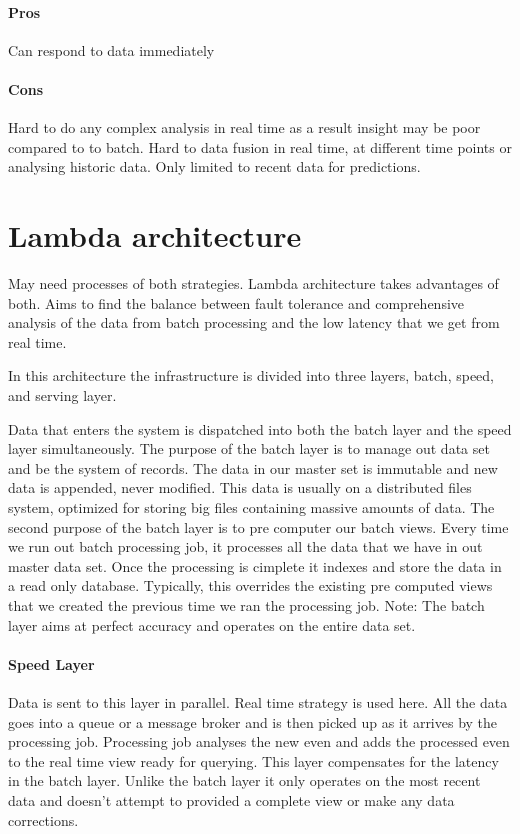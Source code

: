 \documentclass[a4paper, 11pt]{book}
\begin{document}
{    \paragraph{Pros}
    Can respond to data immediately

    \paragraph{Cons}
    Hard to do any complex analysis in real time as a result insight may be poor compared to to batch.
    Hard to data fusion in real time, at different time points or analysing historic data. Only limited to recent data for predictions.


    \section{Lambda architecture}
    May need processes of both strategies.
    Lambda architecture takes advantages of both.
    Aims to find the balance between fault tolerance and comprehensive analysis of the data from batch processing and the low latency that we get from real time.

    In this architecture the infrastructure is divided into three layers, batch, speed, and serving layer.

    Data that enters the system is dispatched into both the batch layer and the speed layer simultaneously.
    The purpose of the batch layer is to manage out data set and be the system of records.
    The data in our master set is immutable and new data is appended, never modified.
    This data is usually on a distributed files system, optimized for storing big files containing massive amounts of data.
    The second purpose of the batch layer is to pre computer our batch views.
    Every time we run out batch processing job, it processes all the data that we have in out master data set.
    Once the processing is cimplete it indexes and store the data in a read only database.
    Typically, this overrides the existing pre computed views that we created the previous time we ran the processing job.
    Note: The batch layer aims at perfect accuracy and operates on the entire data set.

    \paragraph{Speed Layer}
    Data is sent to this layer in parallel.
    Real time strategy is used here.
    All the data goes into a queue or a message broker and is then picked up as it arrives by the processing job.
    Processing job analyses the new even and adds the processed even to the real time view ready for querying.
    This layer compensates for the latency in the batch layer.
    Unlike the batch layer it only operates on the most recent data and doesn't attempt to provided a complete view or make any data corrections.

}
\end{document}
